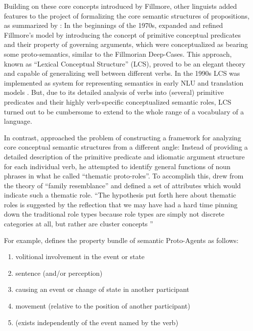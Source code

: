 Building on these core concepts introduced by Fillmore, other linguists added features to
the project of formalizing the core semantic structures of propositions, as summarized by
\citeauthor{palmer2010semantic}: In the beginnings of the 1970s, \cite{jackendoff1972semantic}
expanded and refined Fillmore's model by introducing the concept of primitive conceptual
predicates and their property of governing arguments, which were conceptualized as bearing
some proto-semantics, similar to the Fillmorian Deep-Cases. This approach, known as ``Lexical
Conceptual Structure'' (LCS), proved to be an elegant theory and capable of generalizing
well between different verbs. In the 1990s LCS was implemented as system for representing
semantics in early NLU and translation models \citep{palmer2010semantic}. But, due to its
detailed analysis of verbs into (several) primitive predicates and their highly verb-specific
conceptualized semantic roles, LCS turned out to be cumbersome to extend to the whole range of
a vocabulary of a language.

In contrast, \cite{dowty1991thematic} approached the problem of constructing a framework for
analyzing core conceptual semantic structures from a different angle: Instead of providing
a detailed description of the primitive predicate and idiomatic argument structure for each
individual verb, he attempted to identify general functions of noun phrases in what he called
``thematic proto-roles''. To accomplish this, \citeauthor{dowty1991thematic} drew from the
theory of ``family resemblance'' and defined a set of attributes which would indicate such
a thematic role. ``The hypothesis put forth here about thematic roles is suggested by the
reflection that we may have had a hard time pinning down the traditional role types because
role types are simply not discrete categories at all, but rather are cluster concepts
\textelp{}'' \citep[p.~571]{dowty1991thematic}

For example, \citep[p.~572]{dowty1991thematic} defines the property bundle of semantic Proto-Agents
as follows:

\begin{enumerate}[label=\alph*]
  \item volitional involvement in the event or state
  \item sentence (and/or perception)
  \item causing an event or change of state in another participant
  \item movement (relative to the position of another participant)
  \item (exists independently of the event named by the verb)
\end{enumerate}

